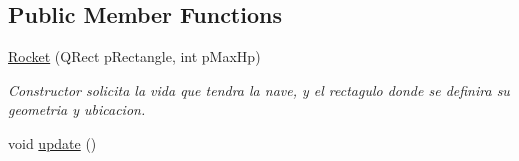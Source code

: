 \subsection*{Public Member Functions}
\begin{DoxyCompactItemize}
\item 
\hyperlink{class_rocket_a1414d17ed74b1da2c082f7f273bf55ab}{Rocket} (Q\-Rect p\-Rectangle, int p\-Max\-Hp)
\begin{DoxyCompactList}\small\item\em Constructor solicita la vida que tendra la nave, y el rectagulo donde se definira su geometria y ubicacion. \end{DoxyCompactList}\item 
\hypertarget{class_rocket_aa0f4dcf673358e841e4b4b2fa0b1462e}{void \hyperlink{class_rocket_aa0f4dcf673358e841e4b4b2fa0b1462e}{update} ()}\label{class_rocket_aa0f4dcf673358e841e4b4b2fa0b1462e}


\end{DoxyCompactItemize}
